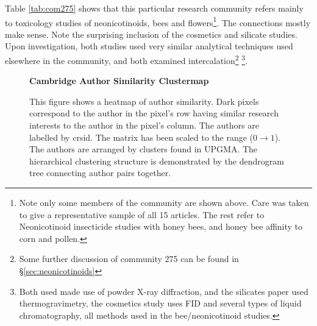 Table \ref{tab:com275} shows that this particular research community refers mainly to toxicology studies of neonicotinoids,  bees and flowers\footnote{Note only some members of the community are shown above. Care was taken to give a representative sample of all 15 articles. The rest refer to Neonicotinoid insecticide studies with honey bees, and honey bee affinity to corn and pollen.}. The connections mostly make sense. Note the surprising inclusion of the cosmetics and silicate studies. Upon investigation, both studies used very similar analytical techniques used elsewhere in the community, and both examined intercalation\footnote{Some further discussion of community 275 can be found in \S\ref{sec:neonicotinoids}} \footnote{Both used made use of powder X-ray diffraction, and the silicates paper used thermogravimetry, the cosmetics study uses FID and several types of liquid chromatography, all methods used in the bee/neonicotinoid studies.}.
\newpage
\begin{center}
\begin{figure}[H]
  \centering
  \textbf{Cambridge Author Similarity Clustermap}
    \caption[Cambrdige Author Similarity Clustermap]{This figure shows a heatmap of author similarity. Dark pixels correspond to the author in the pixel's row having similar research interests to the author in the pixel's column. The authors are labelled by crsid. The matrix has been scaled to the range ($0 \rightarrow 1$).  The authors are arranged by clusters found in UPGMA. The hierarchical clustering structure is demonstrated by the dendrogram tree connecting author pairs together.}
    \label{fig:AUTHORSIMS}
\end{figure} 
\end{center}
